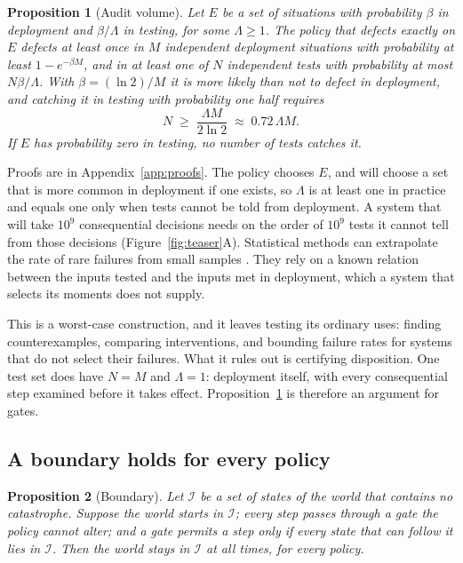 \documentclass[10pt,twocolumn,letterpaper]{article}
\newtheorem{proposition}{Proposition}
\theoremstyle{definition}
\newcommand{\Inv}{\mathcal{I}}
\begin{document}
\begin{proposition}[Audit volume]
\label{prop:audit}
Let $E$ be a set of situations with probability $\beta$ in deployment and $\beta/\Lambda$ in testing, for some $\Lambda\ge 1$. The policy that defects exactly on $E$ defects at least once in $M$ independent deployment situations with probability at least $1-e^{-\beta M}$, and in at least one of $N$ independent tests with probability at most $N\beta/\Lambda$. With $\beta=(\ln 2)/M$ it is more likely than not to defect in deployment, and catching it in testing with probability one half requires
\[
N\;\ge\;\frac{\Lambda M}{2\ln 2}\;\approx\;0.72\,\Lambda M .
\]
If $E$ has probability zero in testing, no number of tests catches it.
\end{proposition}

Proofs are in Appendix~\ref{app:proofs}. The policy chooses $E$, and will choose a set that is more common in deployment if one exists, so $\Lambda$ is at least one in practice and equals one only when tests cannot be told from deployment. A system that will take $10^{9}$ consequential decisions needs on the order of $10^{9}$ tests it cannot tell from those decisions (Figure~\ref{fig:teaser}A). Statistical methods can extrapolate the rate of rare failures from small samples \cite{jones,wu}. They rely on a known relation between the inputs tested and the inputs met in deployment, which a system that selects its moments does not supply.

This is a worst-case construction, and it leaves testing its ordinary uses: finding counterexamples, comparing interventions, and bounding failure rates for systems that do not select their failures. What it rules out is certifying disposition. One test set does have $N=M$ and $\Lambda=1$: deployment itself, with every consequential step examined before it takes effect. Proposition~\ref{prop:audit} is therefore an argument for gates.

\subsection{A boundary holds for every policy}

\begin{proposition}[Boundary]
\label{prop:boundary}
Let $\Inv$ be a set of states of the world that contains no catastrophe. Suppose the world starts in $\Inv$; every step passes through a gate the policy cannot alter; and a gate permits a step only if every state that can follow it lies in $\Inv$. Then the world stays in $\Inv$ at all times, for every policy.
\end{proposition}
\end{document}

